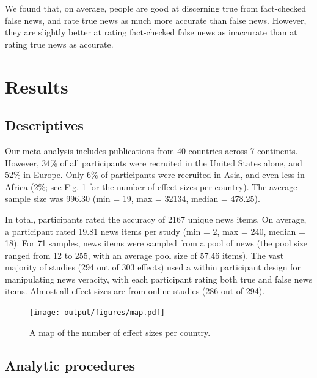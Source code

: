 \documentclass[
  doc,floatsintext]{apa6}
\begin{document}
We found that, on average, people are good at discerning true from fact-checked false news, and rate true news as much more accurate than false news. However, they are slightly better at rating fact-checked false news as inaccurate than at rating true news as accurate.

\section{Results}\label{results}

\subsection{Descriptives}\label{descriptives}

Our meta-analysis includes publications from 40 countries across 7 continents. However, 34\% of all participants were recruited in the United States alone, and 52\% in Europe. Only 6\% of participants were recruited in Asia, and even less in Africa (2\%; see Fig. \ref{fig:map} for the number of effect sizes per country). The average sample size was 996.30 (min = 19, max = 32134, median = 478.25).

In total, participants rated the accuracy of 2167 unique news items. On average, a participant rated 19.81 news items per study (min = 2, max = 240, median = 18). For 71 samples, news items were sampled from a pool of news (the pool size ranged from 12 to 255, with an average pool size of 57.46 items). The vast majority of studies (294 out of 303 effects) used a within participant design for manipulating news veracity, with each participant rating both true and false news items. Almost all effect sizes are from online studies (286 out of 294).



\begin{figure}
\centering
\texttt{[image: output/figures/map.pdf]}
\caption{\label{fig:map}A map of the number of effect sizes per country.}
\end{figure}

\subsection{Analytic procedures}\label{analytic-procedures}
\end{document}
